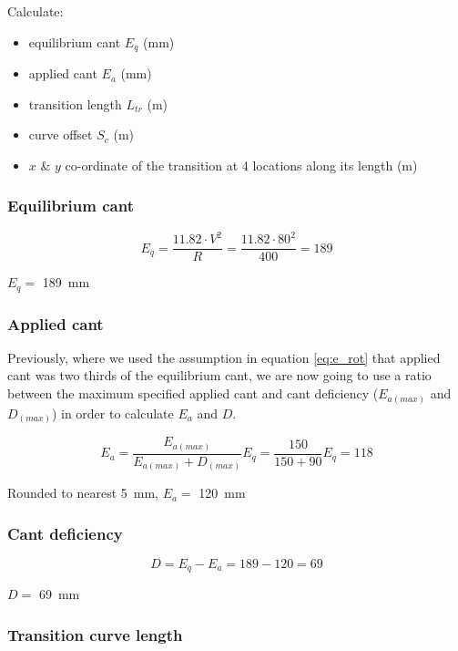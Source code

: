 \documentclass{bcrre_exam}
\begin{document}
Calculate:
\begin{itemize}
    \item equilibrium cant $E_q$ (\unit{mm})
    \item applied cant $E_a$ (\unit{mm})
    \item transition length $L_{tr}$ (\unit{m})
    \item curve offset $S_c$ (\unit{m})
    \item $x$ \& $y$ co-ordinate of the transition at \num{4} locations along its length (\unit{m})
\end{itemize}

\subsubsection*{Equilibrium cant}

\begin{equation}
    E_q=\frac{11.82 \cdot V^2}{R}=\frac{11.82 \cdot 80^2}{400} = 189
\end{equation}

$E_q=$ \qty{189}{mm}

\subsubsection*{Applied cant}

Previously, where we used the assumption in equation \ref{eq:e_rot} that applied cant was two thirds of the equilibrium cant, we are now going to use a ratio between the maximum specified applied cant and cant deficiency ($E_{a(max)}$ and $D_{(max)}$) in order to calculate $E_a$ and $D$.

\begin{equation}
    E_a=\frac{E_{a(max)}}{E_{a(max)}+D_{(max)}}E_q = \frac{150}{150+90}E_q = 118
\end{equation}

Rounded to nearest \qty{5}{mm}, $E_a=$ \qty{120}{mm}

\subsubsection*{Cant deficiency}

\begin{equation}
    D=E_q-E_a=189-120=69
\end{equation}

$D=$ \qty{69}{mm}

\subsubsection*{Transition curve length}
\end{document}
